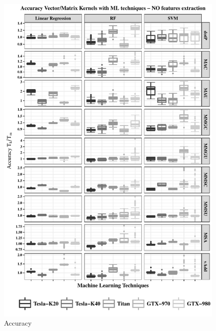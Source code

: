 \begin{figure}[htpb]
    \centering
    \includegraphics[scale=1]{images/ResultTechniques-fair.pdf}
    \caption{Accuracy}
    \label{fig:Results-NCA-Fair}
\end{figure}

